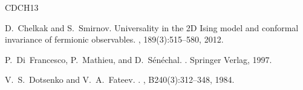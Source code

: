 \documentclass[oneside,english]{amsart}
\numberwithin{equation}{section}
\numberwithin{figure}{section}
\theoremstyle{plain}
\theoremstyle{plain}
\theoremstyle{plain}
\theoremstyle{remark}
\theoremstyle{plain}
\theoremstyle{plain}
\theoremstyle{plain}
\theoremstyle{plain}
\theoremstyle{plain}
\theoremstyle{plain}
\theoremstyle{plain}
\theoremstyle{plain}
\begin{document}
\begin{thebibliography}{CDCH{\etalchar{+}}13}




D.~Chelkak and S.~Smirnov.
\newblock Universality in the 2D Ising model and conformal invariance of fermionic observables.
, 189(3):515--580, 2012.


P.~Di~Francesco, P.~Mathieu, and D.~S\'en\'echal.
.
\newblock Springer Verlag, 1997.

V.~S.~Dotsenko and V.~A.~Fateev.
.
, B240(3):312--348, 1984.




\end{thebibliography}
\end{document}

